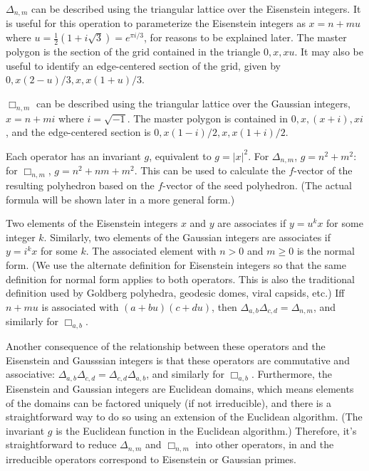 \documentclass{amsart}[12pt]
\begin{document}
$\Delta_{n,m}$ can be described using the triangular lattice over the
Eisenstein integers. It is useful for this operation to parameterize the
Eisenstein integers as $x = n + mu$ where $u = \frac{1}{2}(1 + i\sqrt 3) =
e^{\pi i/3}$, for reasons to be explained later. The master polygon is the
section of the grid contained in the triangle $0, x, xu$. It may also be useful
to identify an edge-centered section of the grid,
given by $0, x(2-u)/3, x, x(1+u)/3$.

$\Box_{n,m}$ can be described using the triangular lattice over the Gaussian
integers, $x = n + mi$ where $i = \sqrt{-1}$. The master polygon is contained
in $0,x,(x+i),xi$, and the edge-centered section is $0, x(1-i)/2, x, x(1+i)/2$.

Each operator has an invariant $g$, equivalent to $g = |x|^2$. For
$\Delta_{n,m}$, $g = n^2 + m^2$: for $\Box_{n,m}$, $g = n^2 + nm + m^2$. This
can be used to calculate the $f$-vector of the resulting polyhedron
based on the $f$-vector of the seed polyhedron. (The actual formula
will be shown later in a more general form.)

Two elements of the Eisenstein integers $x$ and $y$ are associates if
$y = u^k x$ for some integer $k$. Similarly, two elements of the Gaussian integers are
associates if $y = i^k x$ for some $k$. The associated element with $n>0$ and
$m\ge 0$ is the normal form. (We use the alternate definition for Eisenstein
integers so that the same definition for normal form applies to both operators.
This is also the traditional definition used by Goldberg polyhedra, geodesic
domes, viral capsids, etc.) Iff $n+mu$ is associated with $(a+bu)(c+du)$, then
$\Delta_{a,b}\Delta_{c,d} = \Delta_{n,m}$, and similarly for $\Box_{a,b}$.

Another consequence of the relationship between these operators and the
Eisenstein and Gausssian integers is that these operators are commutative and
associative: $\Delta_{a,b}\Delta_{c,d} = \Delta_{c,d}\Delta_{a,b}$, and
similarly for $\Box_{a,b}$. Furthermore, the Eisenstein and Gaussian integers
are Euclidean domains, which means elements of the domains can be factored
uniquely (if not irreducible), and there is a straightforward way to do so
using an extension of the Euclidean algorithm. (The invariant $g$ is the
Euclidean function in the Euclidean algorithm.) Therefore, it's straightforward
to reduce $\Delta_{n,m}$ and $\Box_{n,m}$ into other operators, in
and the irreducible operators correspond to Eisenstein or Gaussian primes.
\end{document}
